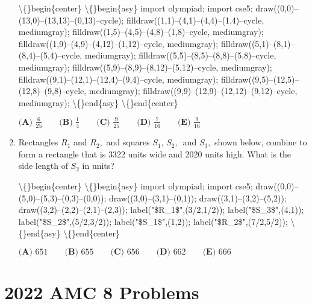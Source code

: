 \documentclass{article}
\begin{document}
\begin{enumerate}[label=\arabic*., itemsep=0.5em]
\textbackslash\{\}begin\{center\}
\textbackslash\{\}begin\{asy\}
import olympiad;
import cse5;
draw((0,0)--(13,0)--(13,13)--(0,13)--cycle);
filldraw((1,1)--(4,1)--(4,4)--(1,4)--cycle, mediumgray);
filldraw((1,5)--(4,5)--(4,8)--(1,8)--cycle, mediumgray);
filldraw((1,9)--(4,9)--(4,12)--(1,12)--cycle, mediumgray);
filldraw((5,1)--(8,1)--(8,4)--(5,4)--cycle, mediumgray);
filldraw((5,5)--(8,5)--(8,8)--(5,8)--cycle, mediumgray);
filldraw((5,9)--(8,9)--(8,12)--(5,12)--cycle, mediumgray);
filldraw((9,1)--(12,1)--(12,4)--(9,4)--cycle, mediumgray);
filldraw((9,5)--(12,5)--(12,8)--(9,8)--cycle, mediumgray);
filldraw((9,9)--(12,9)--(12,12)--(9,12)--cycle, mediumgray);
\textbackslash\{\}end\{asy\}
\textbackslash\{\}end\{center\}


\(\textbf{(A) }\frac6{25} \qquad \textbf{(B) }\frac14 \qquad \textbf{(C) }\frac9{25} \qquad \textbf{(D) }\frac7{16} \qquad \textbf{(E) }\frac9{16}\)\par \vspace{0.5em}\item Rectangles \(R_1\) and \(R_2,\) and squares \(S_1,\,S_2,\,\) and \(S_3,\) shown below, combine to form a rectangle that is 3322 units wide and 2020 units high. What is the side length of \(S_2\) in units?


\textbackslash\{\}begin\{center\}
\textbackslash\{\}begin\{asy\}
import olympiad;
import cse5;
draw((0,0)--(5,0)--(5,3)--(0,3)--(0,0));
draw((3,0)--(3,1)--(0,1));
draw((3,1)--(3,2)--(5,2));
draw((3,2)--(2,2)--(2,1)--(2,3));
label("\$R\_1\$",(3/2,1/2));
label("\$S\_3\$",(4,1));
label("\$S\_2\$",(5/2,3/2));
label("\$S\_1\$",(1,2));
label("\$R\_2\$",(7/2,5/2));
\textbackslash\{\}end\{asy\}
\textbackslash\{\}end\{center\}


\(\textbf{(A) }651 \qquad \textbf{(B) }655 \qquad \textbf{(C) }656 \qquad \textbf{(D) }662 \qquad \textbf{(E) }666\)\par \vspace{0.5em}\end{enumerate}\newpage\section*{2022 AMC 8 Problems}
\end{document}
